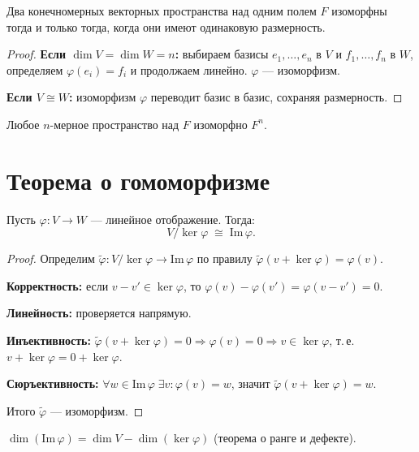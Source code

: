 \documentclass[12pt]{article}
\begin{document}
\begin{theorem}
Два конечномерных векторных пространства над одним полем $F$
изоморфны тогда и только тогда, когда они имеют одинаковую размерность.
\end{theorem}

\begin{proof}
\textbf{Если $\dim V = \dim W = n$:} выбираем базисы
$e_1,\ldots,e_n$ в $V$ и $f_1,\ldots,f_n$ в $W$,
определяем $\varphi(e_i) = f_i$ и продолжаем линейно.
$\varphi$ --- изоморфизм.

\textbf{Если $V \cong W$:} изоморфизм $\varphi$ переводит базис в базис,
сохраняя размерность.
\end{proof}

\begin{corollary}
Любое $n$-мерное пространство над $F$ изоморфно $F^n$.
\end{corollary}

\section{Теорема о гомоморфизме}

\begin{theorem}
Пусть $\varphi\colon V \to W$ --- линейное отображение.
Тогда:
\[
V / \ker\varphi \;\cong\; \mathrm{Im}\,\varphi.
\]
\end{theorem}

\begin{proof}
Определим $\tilde\varphi\colon V/\ker\varphi \to \mathrm{Im}\,\varphi$ по правилу
$\tilde\varphi(v + \ker\varphi) = \varphi(v)$.

\textbf{Корректность:} если $v - v' \in \ker\varphi$, то
$\varphi(v) - \varphi(v') = \varphi(v-v') = 0$.

\textbf{Линейность:} проверяется напрямую.

\textbf{Инъективность:} $\tilde\varphi(v + \ker\varphi) = 0
\Rightarrow \varphi(v) = 0 \Rightarrow v \in \ker\varphi$,
т.\,е.\ $v + \ker\varphi = 0 + \ker\varphi$.

\textbf{Сюръективность:} $\forall w \in \mathrm{Im}\,\varphi\;
\exists v\colon \varphi(v) = w$, значит $\tilde\varphi(v+\ker\varphi) = w$.

Итого $\tilde\varphi$ --- изоморфизм.
\end{proof}

\begin{corollary}
$\dim(\mathrm{Im}\,\varphi) = \dim V - \dim(\ker\varphi)$
(теорема о ранге и дефекте).
\end{corollary}
\end{document}
